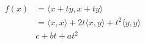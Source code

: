 \documentclass[preview]{standalone}
\begin{document}
\begin{align*}
f(x) & = \langle x + ty,x + ty \rangle \\& = \langle x,x \rangle + 2t \langle x,y \rangle + t^{2} \langle y,y \rangle \\& c+bt+at^{2}
\end{align*}
\end{document}
